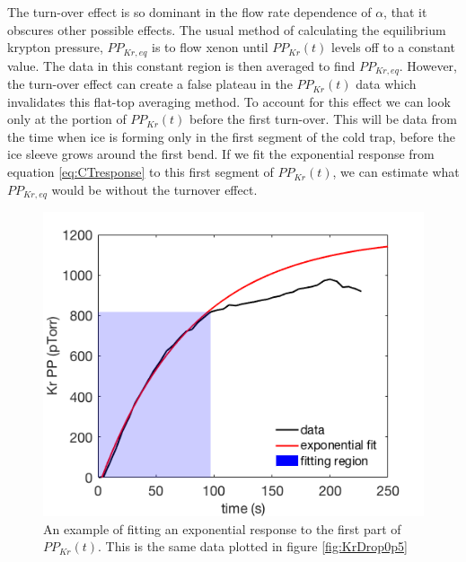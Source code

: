 The turn-over effect is so dominant in the flow rate dependence of $\alpha$, that it obscures other possible effects. The usual method of calculating the equilibrium krypton pressure, $PP_{Kr,eq}$ is to flow xenon until $PP_{Kr}(t)$ levels off to a constant value. The data in this constant region is then averaged to find $PP_{Kr,eq}$. However, the turn-over effect can create a false plateau in the $PP_{Kr}(t)$ data which invalidates this flat-top averaging method. To account for this effect we can look only at the portion of $PP_{Kr}(t)$ before the first turn-over. This will be data from the time when ice is forming only in the first segment of the cold trap, before the ice sleeve grows around the first bend. If we fit the  exponential response from equation \ref{eq:CTresponse} to this first segment of $PP_{Kr}(t)$, we can estimate what $PP_{Kr,eq}$ would be without the turnover effect.
\begin{figure}[h]
  \includegraphics[width=\linewidth]{Figures/turn_over.png}
  \caption{An example of fitting an exponential response to the first part of $PP_{Kr}(t)$. This is the same data plotted in figure \ref{fig:KrDrop0p5}}
  \label{fig:turn_over}
\end{figure}


